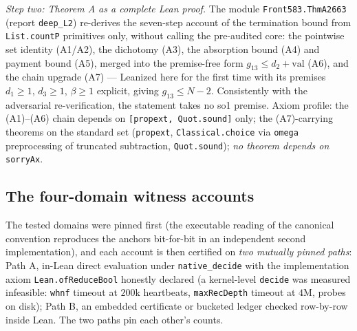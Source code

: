\emph{Step two: Theorem A as a complete Lean proof.} The module
\texttt{Front583.ThmA2663} (report \texttt{deep\_L2}) re-derives the seven-step account of
the termination bound from \texttt{List.countP} primitives only, without calling the
pre-audited core: the pointwise set identity (A1/A2), the dichotomy (A3), the absorption
bound (A4) and payment bound (A5), merged into the premise-free form
$g_{13}\le d_2+\mathrm{val}$ (A6), and the chain upgrade (A7) --- Leanized here for the
first time with its premises $d_1\ge1$, $d_3\ge1$, $\beta\ge1$ explicit, giving
$g_{13}\le N-2$. Consistently with the adversarial re-verification, the statement takes no
so1 premise. Axiom profile: the (A1)--(A6) chain depends on
\texttt{[propext, Quot.sound]} only; the (A7)-carrying theorems on the standard set
(\texttt{propext}, \texttt{Classical.choice} via \texttt{omega} preprocessing of truncated
subtraction, \texttt{Quot.sound}); \emph{no theorem depends on} \texttt{sorryAx}.

\subsection{The four-domain witness accounts}\label{subsec:leandomains}

The tested domains were pinned first (the executable reading of the canonical convention
reproduces the anchors bit-for-bit in an independent second implementation), and each
account is then certified on \emph{two mutually pinned paths}: Path A, in-Lean direct
evaluation under \texttt{native\_decide} with the implementation axiom
\texttt{Lean.ofReduceBool} honestly declared (a kernel-level \texttt{decide} was measured
infeasible: \texttt{whnf} timeout at $200$k heartbeats, \texttt{maxRecDepth} timeout at
$4$M, probes on disk); Path B, an embedded certificate or bucketed ledger checked
row-by-row inside Lean. The two paths pin each other's counts.


